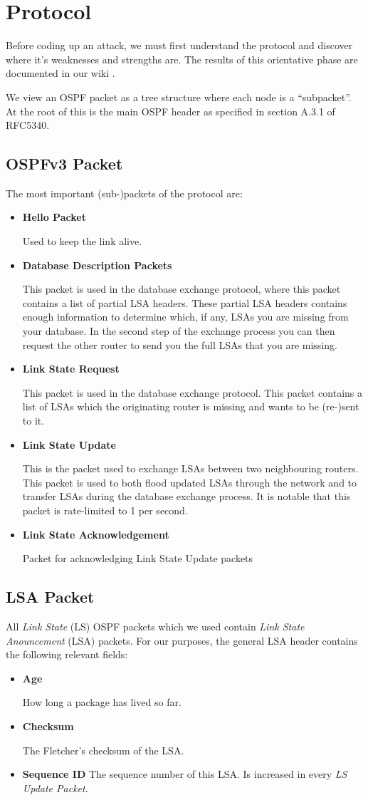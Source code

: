 \documentclass[11pt,a4paper,oneside]{article}
\newcommand{\lsection}[2]{\section{#1}\label{sec:#2}}
\newcommand{\lsubsection}[2]{\subsection{#1}\label{sec:#2}}
\begin{document}
    \lsection{Protocol}{protocol}
    Before coding up an attack, we must first understand the protocol and discover where it's weaknesses and strengths are.
    The results of this orientative phase are documented in our wiki \cite{wiki}.

    We view an OSPF packet as a tree structure where each node is a ``subpacket''.
    At the root of this is the main OSPF header as specified in section A.3.1 of RFC5340. \cite[A.3.1]{rfc-5340}
    \lsubsection{OSPFv3 Packet}{ospfv3_packet}
    The most important (sub-)packets of the protocol are:
    \begin{itemize}
        \item \textbf{Hello Packet}

        Used to keep the link alive.
        \item \textbf{Database Description Packets}

        This packet is used in the database exchange protocol, where this packet contains a list of partial LSA headers.
        These partial LSA headers contains enough information to determine which, if any, LSAs you are missing from your database.
        In the second step of the exchange process you can then request the other router to send you the full LSAs that you are missing.
        \item \textbf{Link State Request}

        This packet is used in the database exchange protocol.
        This packet contains a list of LSAs which the originating router is missing and wants to be (re-)sent to it.
        \item \textbf{Link State Update}

        This is the packet used to exchange LSAs between two neighbouring routers.
        This packet is used to both flood updated LSAs through the network and to transfer LSAs during the database exchange process.
        It is notable that this packet is rate-limited to 1 per second.
        \item \textbf{Link State Acknowledgement}

        Packet for acknowledging Link State Update packets
    \end{itemize}
    \lsubsection{LSA Packet}{lsa_packet}
    All \textit{Link State} (LS) OSPF packets which we used contain \textit{Link State Anouncement} (LSA) packets.
    For our purposes, the general LSA header contains the following relevant fields:
    \begin{itemize}
        \item \textbf{Age}

        How long a package has lived so far.
        \item \textbf{Checksum}

        The Fletcher's checksum\cite{fletcher} of the LSA.
        \item \textbf{Sequence ID}
        The sequence number of this LSA. Is increased in every \textit{LS Update Packet}.
    \end{itemize}
\end{document}
